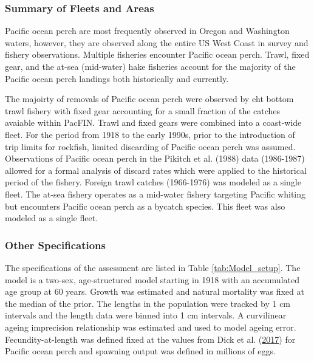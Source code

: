 \documentclass[12pt,]{article}
\begin{document}
\subsubsection{Summary of Fleets and
Areas}\label{summary-of-fleets-and-areas}

Pacific ocean perch are most frequently observed in Oregon and
Washington waters, however, they are observed along the entire US West
Coast in survey and fishery observations. Multiple fisheries encounter
Pacific ocean perch. Trawl, fixed gear, and the at-sea (mid-water) hake
fisheries account for the majority of the Pacific ocean perch landings
both historically and currently.

The majoirty of removals of Pacific ocean perch were observed by eht
bottom trawl fishery with fixed gear accounting for a small fraction of
the catches avaiable within PacFIN. Trawl and fixed gears were combined
into a coast-wide fleet. For the period from 1918 to the early 1990s,
prior to the introduction of trip limits for rockfish, limited
discarding of Pacific ocean perch was assumed. Observations of Pacific
ocean perch in the Pikitch et al. (1988) data (1986-1987) allowed for a
formal analysis of discard rates which were applied to the historical
period of the fishery. Foreign trawl catches (1966-1976) was modeled as
a single fleet. The at-sea fishery operates as a mid-water fishery
targeting Pacific whiting but encounters Pacific ocean perch as a
bycatch species. This fleet was also modeled as a single fleet.

\subsubsection{Other Specifications}\label{other-specifications}

The specifications of the assessment are listed in Table
\ref{tab:Model_setup}. The model is a two-sex, age-structured model
starting in 1918 with an accumulated age group at 60 years. Growth was
estimated and natural mortality was fixed at the median of the prior.
The lengths in the population were tracked by 1 cm intervals and the
length data were binned into 1 cm intervals. A curvilinear ageing
imprecision relationship was estimated and used to model ageing error.
Fecundity-at-length was defined fixed at the values from Dick et al.
(\protect\hyperlink{ref-dick_meta-analysis_2017}{2017}) for Pacific
ocean perch and spawning output was defined in millions of eggs.
\end{document}
